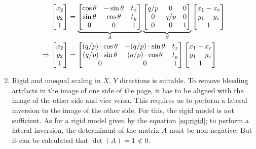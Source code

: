 \documentclass[a4paper]{article}
\begin{document}
\begin{enumerate}[label=(\alph*)]
\begin{align}{\label{eq:rigidequalscaling}}
		\begin{bmatrix}
			x_2\\y_2\\1
		\end{bmatrix}
		&=
		\underbrace{
		\begin{bmatrix}
			\cos\theta & -\sin\theta & t_x\\
			\sin\theta & \cos\theta  & t_y\\
			0          & 0           & 1\\
		\end{bmatrix}
		}_{A}
		\underbrace{
		\begin{bmatrix}
			q/p & 0 & 0\\
			 0 & q/p & 0\\
			 0 & 0 & 1\\
		\end{bmatrix}
		}_{S}
		\begin{bmatrix}
			x_1-x_c\\y_1 - y_c\\1
		\end{bmatrix}
		\\
		\Rightarrow
		\begin{bmatrix}
			x_2\\y_2\\1
		\end{bmatrix}
		&=
		\begin{bmatrix}
			(q/p)\cdot\cos\theta & -(q/p)\cdot\sin\theta & t_x\\
			(q/p)\cdot\sin\theta & (q/p)\cdot\cos\theta  & t_y\\
			0                    & 0                     & 1\\
		\end{bmatrix}
		\begin{bmatrix}
			x_1-x_c\\y_1 - y_c\\1
		\end{bmatrix}
	\end{align}
	\item Rigid and unequal scaling in $X$, $Y$ directions is suitable. To remove bleeding artifacts in the image of one side of the page, it has to be aligned with the image of the other side and vice versa. This requires us to perform a lateral inversion to the image of the other side. For this, the rigid model is not sufficient. As for a rigid model given by the equation \ref{eq:rigid}; to perform a lateral inversion, the determinant of the matrix $A$ must be non-negative. But it can be calculated that $\operatorname{det}(A)=1 \nless 0$.

\end{enumerate}
\end{document}
